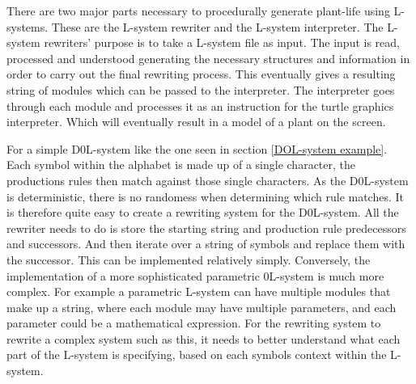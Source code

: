 

\lettrine[lines=3]{T}{}here are two major parts necessary to procedurally generate plant-life using L-systems. These are the L-system rewriter and the L-system interpreter. The L-system rewriters' purpose is to take a L-system file as input. The input is read, processed and understood generating the necessary structures and information in order to carry out the final rewriting process. This eventually gives a resulting string of modules which can be passed to the interpreter. The interpreter goes through each module and processes it as an instruction for the turtle graphics interpreter. Which will eventually result in a model of a plant on the screen.

For a simple D0L-system like the one seen in section \ref{DOL-system example}. Each symbol within the alphabet is made up of a single character, the productions rules then match against those single characters. As the D0L-system is deterministic, there is no randomess when determining which rule matches. It is therefore quite easy to create a rewriting system for the D0L-system. All the rewriter needs to do is store the starting string and production rule predecessors and successors. And then iterate over a string of symbols and replace them with the successor. This can be implemented relatively simply. Conversely, the implementation of a more sophisticated  parametric 0L-system is much more complex. For example a parametric L-system can have multiple modules that make up a string, where each module may have multiple parameters, and each parameter could be a mathematical expression. For the rewriting system to rewrite a complex system such as this, it needs to better understand what each part of the L-system is specifying, based on each symbols context within the L-system.


